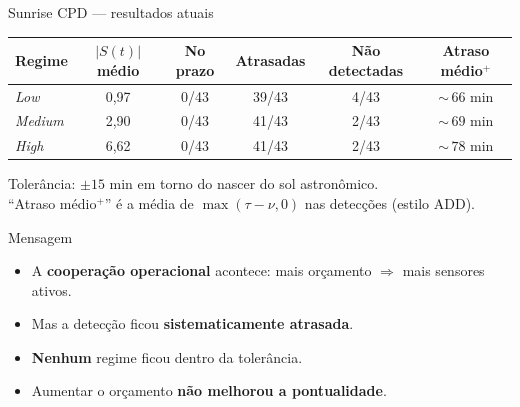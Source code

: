 \documentclass[aspectratio=169, 11pt]{beamer}
\begin{document}
\begin{frame}{Sunrise CPD --- resultados atuais}

\begin{center}
\small
\begin{tabular}{@{}lccccc@{}}
  \toprule
  \textbf{Regime} & $|S(t)|$ médio &
  \textbf{No prazo} & \textbf{Atrasadas} & \textbf{Não detectadas} &
  \textbf{Atraso médio$^{+}$} \\
  \midrule
  \textit{Low}    & 0{,}97 & 0/43 & 39/43 & 4/43 & ${\sim}\,66$ min \\
  \textit{Medium} & 2{,}90 & 0/43 & 41/43 & 2/43 & ${\sim}\,69$ min \\
  \textit{High}   & 6{,}62 & 0/43 & 41/43 & 2/43 & ${\sim}\,78$ min \\
  \bottomrule
\end{tabular}
\end{center}

\vspace{0.3em}
\small
Tolerância: $\pm 15$ min em torno do nascer do sol astronômico.\\
``Atraso médio$^{+}$'' é a média de $\max(\tau - \nu, 0)$ nas detecções (estilo ADD).

\vspace{0.5em}
\begin{block}{Mensagem}
\begin{itemize}
  \item A \textbf{cooperação operacional} acontece: mais orçamento $\Rightarrow$ mais sensores ativos.
  \item Mas a detecção ficou \textbf{sistematicamente atrasada}.
  \item \textbf{Nenhum} regime ficou dentro da tolerância.
  \item Aumentar o orçamento \textbf{não melhorou a pontualidade}.
\end{itemize}
\end{block}

\end{frame}
\end{document}
